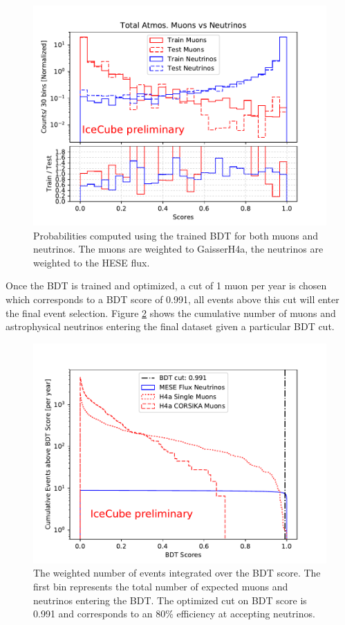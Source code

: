 \documentclass{PoS}
\begin{document}
\begin{figure}[h!]
\centering 
    \includegraphics[width=0.85\linewidth]{bdt_scores_best_muongun_resampled_corsika_no_weights_xgboost_model.pdf}
    \caption{Probabilities computed using the trained BDT for both muons and neutrinos. The muons are weighted to GaisserH4a, the neutrinos are weighted to the HESE flux.}
\label{fig:BDToutputs}
\end{figure}

Once the BDT is trained and optimized, a cut of 1 muon per year is chosen which corresponds to a BDT score of 0.991, all events above this cut will enter the final event selection. Figure \ref{fig:BDT_cuts} shows the cumulative number of muons and astrophysical neutrinos entering the final dataset given a particular BDT cut.

\begin{figure}[h!]
\centering 
    \includegraphics[width=0.85\linewidth]{real_bdt_cut_cumulative_plot.pdf}
    \caption{The weighted number of events integrated over the BDT score. The first bin represents the total number of expected muons and neutrinos entering the BDT. The optimized cut on BDT score is 0.991 and corresponds to an 80$\%$ efficiency at accepting neutrinos.}
\label{fig:BDT_cuts}
\end{figure}
\end{document}
